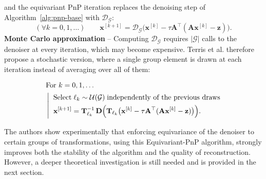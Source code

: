 \documentclass{article}
\newcommand{\R}{\mathbb{R}}
\newcommand{\xb}{\mathbf{x}}
\newcommand{\Ab}{\mathbf{A}}
\newcommand{\zb}{\mathbf{z}}
\begin{document}
\noindent and the equivariant PnP iteration replaces the denoising step of
Algorithm~\eqref{alg:pnp-base} with $\mathcal{D}_\mathcal{G}$:
$$
 (\forall k=0,1,\dots) \qquad \xb^{[k+1]} = \mathcal{D}_\mathcal{G}\big(\xb^{[k]} - \tau \Ab^\top (\Ab\xb^{[k]} - \zb)\big).
$$
%
\noindent \textbf{Monte Carlo approximation} -- Computing $\mathcal{D}_\mathcal{G}$ requires $|\mathcal{G}|$ calls to
the denoiser at every iteration, which may become expensive. %
Terris et al. \cite{Terris2024} therefore propose a stochastic version, where a
single group element is drawn at each iteration instead of averaging
over all of them:\vspace{-0.6cm}

%
\begin{align}
\label{alg:pnp-mc-terris}
    &\text{For } k=0,1,\dots \nonumber\\
    &\left|
    \begin{aligned}
        &\;\;\text{Select} \;\ell_k \sim \mathcal{U}(\mathcal{G}) \;\text{independently of the previous draws}\\
        &\;\;\xb^{[k+1]} = \mathbf{T}_{\ell_k}^{-1}\, \mathbf{D}\Big(\mathbf{T}_{\ell_k}\big(\xb^{[k]} - \tau \Ab^\top (\Ab\xb^{[k]} - \zb)\big)\Big).
    \end{aligned}
    \right.\raisetag{17pt}
\end{align}\vspace{-0.1cm}

\noindent The authors show experimentally that enforcing equivariance of the denoiser to certain groups of transformations, using this Equivariant-PnP algorithm, strongly improves both the stability of the algorithm and the quality of reconstruction. However, a deeper theoretical investigation is still needed and is provided in the next section.
\end{document}
